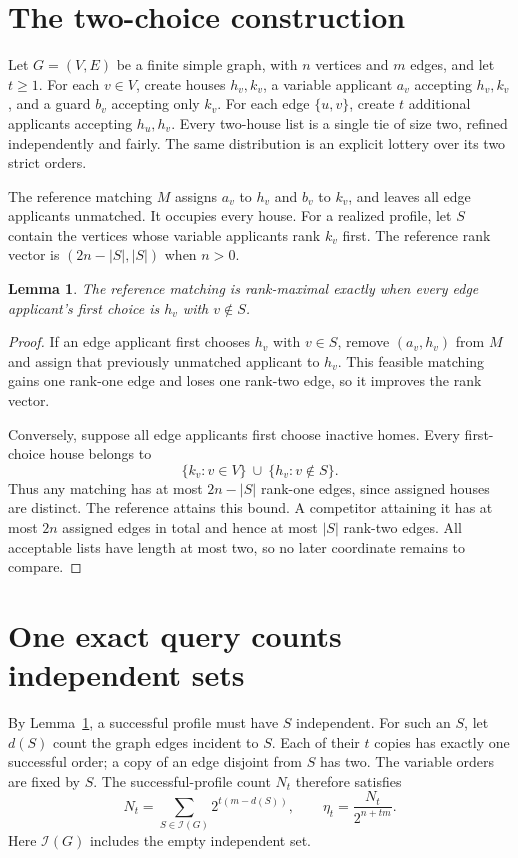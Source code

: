 \documentclass[10pt]{article}
\newtheorem{lemma}{Lemma}
\newcommand{\IS}{\mathcal I}
\begin{document}
\section*{The two-choice construction}
Let $G=(V,E)$ be a finite simple graph, with $n$ vertices and $m$ edges,
and let $t\geq1$. For each $v\in V$, create houses $h_v,k_v$, a variable
applicant $a_v$ accepting $h_v,k_v$, and a guard $b_v$ accepting only $k_v$.
For each edge $\{u,v\}$, create $t$ additional applicants accepting
$h_u,h_v$. Every two-house list is a single tie of size two, refined
independently and fairly. The same distribution is an explicit lottery
over its two strict orders.

The reference matching $M$ assigns $a_v$ to $h_v$ and $b_v$ to $k_v$,
and leaves all edge applicants unmatched. It occupies every house.
For a realized profile, let $S$ contain the vertices whose variable
applicants rank $k_v$ first. The reference rank vector is
$(2n-|S|,|S|)$ when $n>0$.

\begin{lemma}\label{lem:criterion}
The reference matching is rank-maximal exactly when every edge
applicant's first choice is $h_v$ with $v\notin S$.
\end{lemma}
\begin{proof}
If an edge applicant first chooses $h_v$ with $v\in S$, remove
$(a_v,h_v)$ from $M$ and assign that previously unmatched applicant
to $h_v$. This feasible matching gains one rank-one edge and loses
one rank-two edge, so it improves the rank vector.

Conversely, suppose all edge applicants first choose inactive homes.
Every first-choice house belongs to
\[
 \{k_v:v\in V\}\ \cup\ \{h_v:v\notin S\}.
\]
Thus any matching has at most $2n-|S|$ rank-one edges, since assigned
houses are distinct. The reference attains this bound. A competitor
attaining it has at most $2n$ assigned edges in total and hence at most
$|S|$ rank-two edges. All acceptable lists have length at most two,
so no later coordinate remains to compare.
\end{proof}

\section*{One exact query counts independent sets}
By Lemma~\ref{lem:criterion}, a successful profile must have $S$ independent.
For such an $S$, let $d(S)$ count the graph edges incident to $S$.
Each of their $t$ copies has exactly one successful order; a copy of
an edge disjoint from $S$ has two. The variable orders are fixed by $S$.
The successful-profile count $N_t$ therefore satisfies
\begin{equation}\label{eq:count}
 N_t=\sum_{S\in\IS(G)}2^{t(m-d(S))},
 \qquad \eta_t=\frac{N_t}{2^{n+tm}}.
\end{equation}
Here $\IS(G)$ includes the empty independent set.
\end{document}
